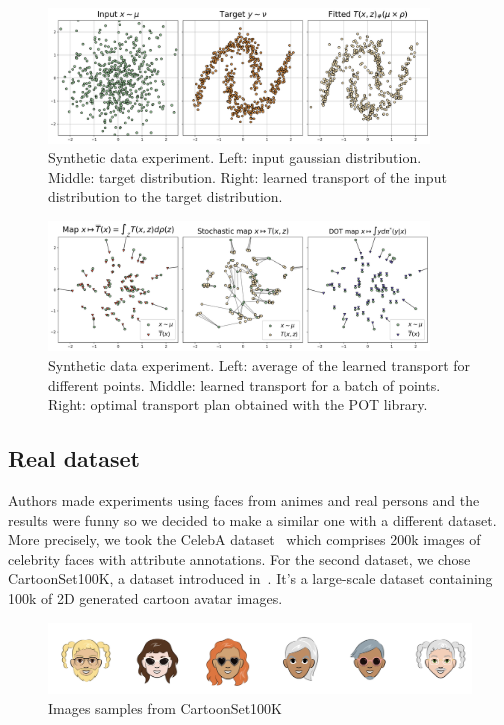 \documentclass[11pt]{article}
\begin{document}
\begin{figure}[H]
    \centering
    \includegraphics[width=0.9\textwidth]{figures/toy_1.png}
    \caption{Synthetic data experiment. Left: input gaussian distribution. Middle: target distribution. Right: learned transport of the input distribution to the target distribution.}
    \label{fig:toy_1}
\end{figure}

\begin{figure}[H]
    \centering
    \includegraphics[width=0.9\textwidth]{figures/toy_2.png}
    \caption{Synthetic data experiment. Left: average of the learned transport for different points. Middle: learned transport for a batch of points. Right: optimal transport plan obtained with the POT library.}
    \label{fig:toy_2}
\end{figure}

\subsection{Real dataset}

Authors made experiments using faces from animes and real persons and the results were funny so we decided to make a similar one with a different dataset. More precisely, we took the CelebA dataset~\cite{celeba_dataset} which comprises 200k images of celebrity faces with attribute annotations. For the second dataset, we chose CartoonSet100K, a dataset introduced in~\cite{cartoonset_dataset}. It's a large-scale dataset containing 100k of 2D generated cartoon avatar images.

\begin{figure}[h!]
    \centering
    \includegraphics[scale=.2]{figures/cartoonset-excerpt.png}
    \caption{Images samples from CartoonSet100K}
\end{figure}
\end{document}
